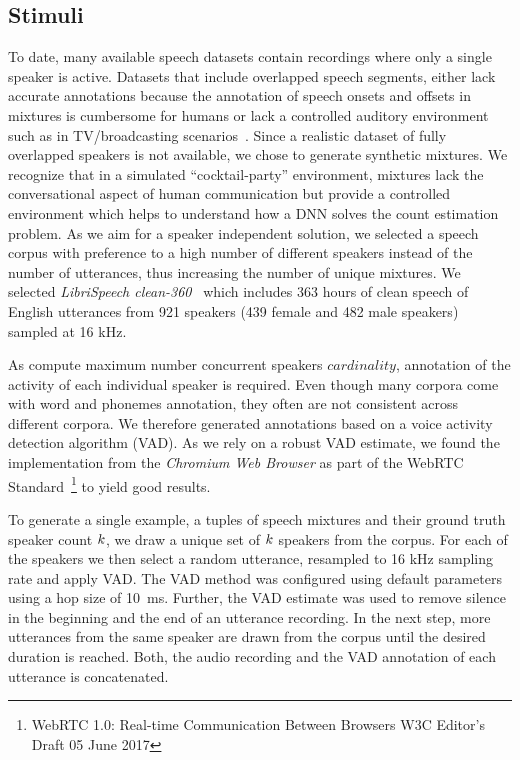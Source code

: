 \subsection{Stimuli}
To date, many available speech datasets contain recordings where only a single speaker is active.
Datasets that include overlapped speech segments, either lack accurate annotations because the annotation of speech onsets and offsets in mixtures is cumbersome for humans or lack a controlled auditory environment such as in TV/broadcasting scenarios~\cite{Gravier12}.
Since a realistic dataset of fully overlapped speakers is not available, we chose to generate synthetic mixtures.
We recognize that in a simulated ``cocktail-party'' environment, mixtures lack the conversational aspect of human communication but provide a controlled environment which helps to understand how a DNN solves the count estimation problem.
As we aim for a speaker independent solution, we selected a speech corpus with preference to a high number of different speakers instead of the number of utterances, thus increasing the number of unique mixtures.
We selected \emph{LibriSpeech clean-360}~\cite{panayotov15} which includes 363 hours of clean speech of English utterances from 921 speakers (439 female and 482 male speakers) sampled at 16 kHz.
\par
As compute maximum number concurrent speakers \(cardinality\), annotation of the activity of each individual speaker is required.
Even though many corpora come with word and phonemes annotation, they often are not consistent across different corpora.
We therefore generated annotations based on a voice activity detection algorithm (VAD). As we rely on a robust VAD estimate, we found the implementation from the \emph{Chromium Web Browser} as part of the WebRTC Standard~\footnote{WebRTC 1.0: Real-time Communication Between Browsers W3C Editor's Draft 05 June 2017} to yield good results.
\par
To generate a single example, a tuples of speech mixtures and their ground truth speaker count \(k \), we draw a unique set of \(k \) speakers from the corpus.
For each of the speakers we then select a random utterance, resampled to 16 kHz sampling rate and apply VAD.\@
The VAD method was configured using default parameters using a hop size of 10~ms.
Further, the VAD estimate was used to remove silence in the beginning and the end of an utterance recording.
In the next step, more utterances from the same speaker are drawn from the corpus until the desired duration is reached.
Both, the audio recording and the VAD annotation of each utterance is concatenated.
